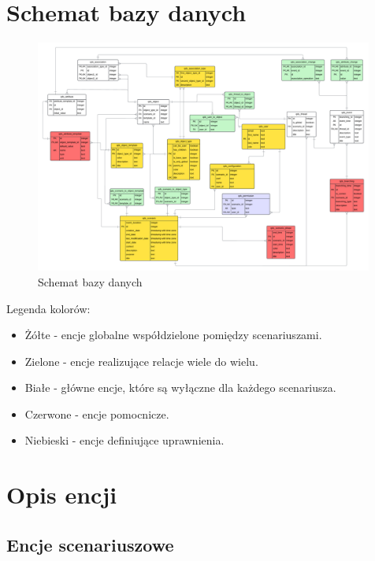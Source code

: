 \newpage
\section{Schemat bazy danych}

\begin{figure}[h!]
    \centering
    \includegraphics[width=0.99\textwidth]{resources/local/baza-danych-schemat.png}
    \caption{Schemat bazy danych}
\end{figure}

Legenda kolorów:
\begin{itemize}
    \item Żółte - encje globalne współdzielone pomiędzy scenariuszami.
    \item Zielone - encje realizujące relacje wiele do wielu.
    \item Białe - główne encje, które są wyłączne dla każdego scenariusza.
    \item Czerwone - encje pomocnicze.
    \item Niebieski - encje definiujące uprawnienia.
\end{itemize}

\section{Opis encji}

\subsection{Encje scenariuszowe}

